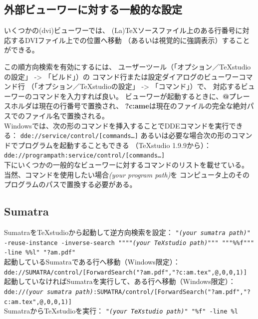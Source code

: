 \subsection{外部ビューワーに対する一般的な設定}

いくつかの(dvi)ビューワーでは、
(La)TeXソースファイル上のある行番号に対応するDVIファイル上での位置へ移動
（あるいは視覚的に強調表示）することができる。

この順方向検索を有効にするには、
ユーザーツール（「オプション／TeXstudioの設定」 -\textgreater{} 「ビルド」）の
コマンド行または設定ダイアログのビューワーコマンド行
（「オプション／TeXstudioの設定」 -\textgreater{} 「コマンド」）で、
対応するビューワーのコマンドを入力すれば良い。
ビューワーが起動するときに、\textbf{@}プレースホルダは現在の行番号で置換され、
\textbf{?c:ame}は現在のファイルの完全な絶対パスでのファイル名で置換される。\\


Windowsでは、次の形のコマンドを挿入することでDDEコマンドを実行できる：
\texttt{dde://service/control/{[}commands\ldots{}{]}}
あるいは必要な場合次の形のコマンドでプログラムを起動することもできる
（TeXstudio 1.9.9から）：
\texttt{dde://programpath:service/control/{[}commands\ldots{}{]}}\\


下にいくつかの一般的なビューワーに対するコマンドのリストを載せている。
当然、コマンドを使用したい場合\emph{(your program path)}を
コンピュータ上のそのプログラムのパスで置換する必要がある。

\subsection{Sumatra}

SumatraをTeXstudioから起動して逆方向検索を設定：
\texttt{"\emph{(your sumatra path)}" -reuse-instance -inverse-search
 """"\emph{(your TeXstudio path)}""" """\%\%f""" -line \%\%l" "?am.pdf"}\\


起動しているSumatraである行へ移動（Windows限定）：\\
\texttt{dde://SUMATRA/control/{[}ForwardSearch("?am.pdf","?c:am.tex",@,0,0,1){]}}\\


起動していなければSumatraを実行して、ある行へ移動（Windows限定）：
\texttt{dde://\emph{(your sumatra path)}:SUMATRA/control/{[}ForwardSearch("?am.pdf","?c:am.tex",@,0,0,1){]}}\\


SumatraからTeXstudioを実行： \texttt{"\emph{(your TeXstudio path)}" "\%f" -line \%l}\\


